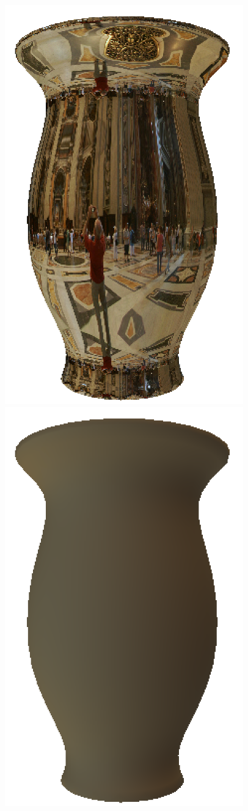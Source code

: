 \documentclass{article}
\theoremstyle{definition}
\theoremstyle{definition}
\begin{document}
\begin{figure}[h]
    \includegraphics[scale=0.25]{vase2}
    \includegraphics[scale=0.25]{vase2-sh}
    \centering
\end{figure}
\end{document}
